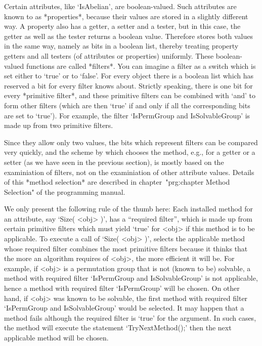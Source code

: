 \null

%
%
Certain attributes, like `IsAbelian', are boolean-valued. Such attributes
are known to {\GAP} as *properties*, because their values are stored in a
slightly different way.   A property also  has a  getter, a  setter and a
tester, but  in this case,  the  getter as well  as the  tester returns a
boolean value. Therefore {\GAP}  stores   both values  in the same   way,
namely as bits  in a boolean  list, thereby treating property getters and
all testers (of attributes or properties) uniformly. These boolean-valued
functions  are called  *filters*.  You can imagine  a filter  as a switch
which is  set either  to `true' or  to `false'.  For every  {\GAP} object
there is a boolean list which has reserved a  bit for every filter {\GAP}
knows  about. Strictly speaking, there   is one bit for every  *primitive
filter*, and these  primitive filters can be  combined with `and' to form
other filters (which are then `true' if and only if all the corresponding
bits are    set  to `true').  For example,    the filter `IsPermGroup and
IsSolvableGroup' is made up from two primitive filters.

Since they allow only two values, the bits which represent filters can be
compared very quickly, and the scheme by which {\GAP} chooses the method,
e.g., for a getter or a setter (as we have seen in the previous section),
is mostly based  on the examiniation of filters,  not on the examiniation
of other  attribute   values. Details  of   this *method selection*   are
described  in chapter~"prg:chapter  Method  Selection" of the programming
manual.

We  only present the following  rule  of the  thumb here: Each  installed
method for an attribute, say `Size(  <obj> )', has a ``required filter'',
which is made  up from certain primitive filters  which must yield `true'
for <obj> if this method is to be applicable. To execute a call of `Size(
<obj>   )', {\GAP} selects  the  applicable  method whose required filter
combines the most  primitive filters because  it thinks that the more  an
algorithm requires of <obj>, the more efficient  it will be. For example,
if <obj>  is a permutation group  that is not  (known to be)  solvable, a
method  with required filter   `IsPermGroup  and IsSolvableGroup'  is not
applicable,  hence a  method with  required  filter `IsPermGroup' will be
chosen. On  other  hand, if <obj>  was  known to be   solvable, the first
method with required filter  `IsPermGroup  and IsSolvableGroup' would  be
selected. It may happen that a  method fails although the required filter
is  `true' for the  argument. In such  cases, the method will execute the
statement  `TryNextMethod();' then the  next   applicable method will  be
chosen.


